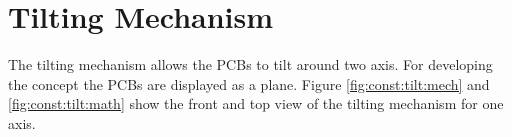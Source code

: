 \section{Tilting Mechanism}\label{sec:const:tilt}



The tilting mechanism allows the PCBs to tilt around two axis. For developing the concept the PCBs are displayed as a plane. Figure \ref{fig:const:tilt:mech} and \ref{fig:const:tilt:math} show the front and top view of the tilting mechanism for one axis.
%
